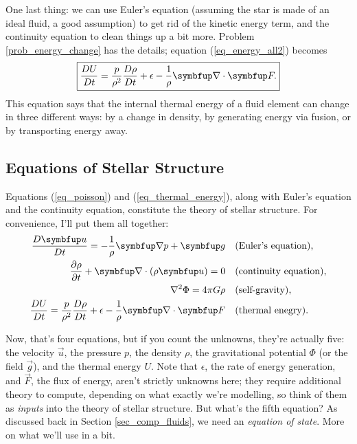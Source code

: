 One last thing:  we can use Euler's equation (assuming the star is made of an ideal fluid, a good assumption) to get rid of the kinetic energy term, and the continuity equation to clean things up a bit more.  Problem \ref{prob_energy_change} has the details; equation (\ref{eq_energy_all2}) becomes
\begin{equation}
\label{eq_thermal_energy}
\boxed{
\frac{DU}{Dt} = \frac{p}{\rho^2} \frac{D\rho}{Dt} + \epsilon - \frac{1}{\rho} \grad \cdot \vec{F}.
}
\end{equation}
This equation says that the internal thermal energy of a fluid element can change in three different ways:  by a change in density, by generating energy via fusion, or by transporting energy away. 

\subsection{Equations of Stellar Structure}

Equations (\ref{eq_poisson}) and (\ref{eq_thermal_energy}), along with Euler's equation and the continuity equation, constitute the theory of stellar structure.  For convenience, I'll put them all together:
\begin{align*}
\frac{D \uu}{Dt} = -\frac{1}{\rho} \grad p + \vec{g} & \quad \text{(Euler's equation),} \\
\frac{\partial \rho}{\partial t} + \vec{\nabla} \cdot (\rho \vec{u} ) = 0 & \quad \text{(continuity equation),} \\
\nabla^2 \Phi = 4 \pi G \rho & \quad \text{(self-gravity),} \\
\frac{DU}{Dt} = \frac{p}{\rho^2} \frac{D\rho}{Dt} + \epsilon - \frac{1}{\rho}  \grad \cdot \vec{F} & \quad \text{(thermal enegry).}
\end{align*}

Now, that's four equations, but if you count the unknowns, they're actually five:  the velocity $\vec{u}$, the pressure $p$, the density $\rho$, the gravitational potential $\Phi$ (or the field $\vec{g}$), and the thermal energy $U$.  Note that $\epsilon$, the rate of energy generation, and $\vec{F}$, the flux of energy, aren't strictly unknowns here; they require additional theory to compute, depending on what exactly we're modelling, so think of them as \emph{inputs} into the theory of stellar structure. But what's the fifth equation?  As discussed back in Section \ref{sec_comp_fluids}, we need an \emph{equation of state}.  More on what we'll use in a bit.

